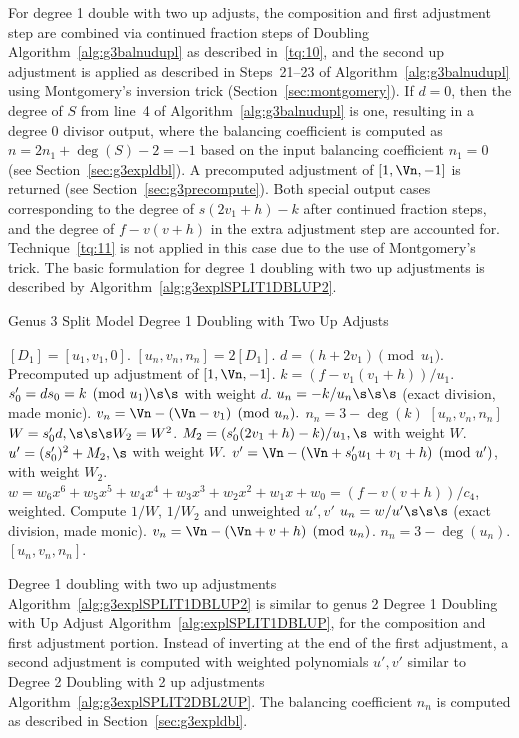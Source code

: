 For degree 1 double with two up adjusts, the composition and first adjustment
step are combined via continued
fraction steps of Doubling Algorithm~\ref{alg:g3balnudupl} as described
in~\ref{tq:10}, and the second up adjustment is applied as described in
Steps~21--23 of Algorithm~\ref{alg:g3balnudupl} using Montgomery's inversion
trick (Section~\ref{sec:montgomery}). If $d = 0$, then the degree of $S$ from
line~4 of Algorithm~\ref{alg:g3balnudupl} is one, resulting in a degree 0
divisor output, where the balancing coefficient is computed as $n = 2n_1 + \deg(S)
- 2 = -1$ based on the input balancing coefficient $n_1 = 0$ (see
Section~\ref{sec:g3expldbl}). A precomputed adjustment of $[1,\Vn,-1]$ is
returned (see Section~\ref{sec:g3precompute}). Both special output cases
corresponding to the degree of $s(2v_1 + h) - k$ after continued fraction steps,
and the degree of $f - v(v +h)$ in the extra adjustment step are accounted for.
Technique~\ref{tq:11} is not applied in this case due to the use of Montgomery's
trick. The basic formulation for degree 1 doubling with two up adjustments is
described by Algorithm~\ref{alg:g3explSPLIT1DBLUP2}.

\begin{algorithm}[htbp]
\caption{Genus 3 Split Model Degree 1 Doubling with Two Up Adjusts \label{alg:g3explSPLIT1DBLUP2}}
\begin{algorithmic} [1]
\Require $[D_1] = [u_1,v_1,0]$.  \smallskip
\Ensure $[u_n,v_n,n_n] = 2[D_1]$.
\algrule
\State
\State $d = (h + 2v_1) \pmod{u_1}$.
 \Return Precomputed up adjustment of $[1,\Vn,-1]$.
\EndIf
\State $k = (f - v_1(v_1 + h))/u_1$.
\State $s_0' = ds_0 = k \pmod{u_1} \s\s$ with weight $d$.
    \State $u_n = -k/u_n \s\s\s$ (exact division, made monic).
    \State $v_n = \Vn - (\Vn - v_1)  \pmod{u_n}.$
    \State $n_n = 3 - \deg(k)$
    \State \Return $[u_n,v_n,n_n]$
\EndIf
\State $W = s_0'd, \s\s\s W_2 = W^2$.
\State $M_2 = (s_0'(2v_1 + h)- k)/u_1, \s$ with weight $W$.
\State $u' = (s_0')^2 + M_2, \s $ with weight $W$.
\State $v' = \Vn - (\Vn + s_0'u_1 + v_1 + h) \pmod{u'}$, with weight $W_2$.
\State $w = w_6x^6 + w_5x^5 + w_4x^4 + w_3x^3 + w_2x^2 +w_1x + w_0 = (f - v(v + h))/c_4$, weighted.
\State Compute $1/W$, $1/W_2$ and unweighted $u',v'$
\State $u_n = w/u' \s\s\s$ (exact division, made monic).
\State $v_n = \Vn - (\Vn + v + h) \pmod{u_n}$.
\State $n_n = 3 - \deg(u_n)$.
\State \Return $[u_n,v_n,n_n]$.
\end{algorithmic}
\end{algorithm}
Degree 1 doubling with two up adjustments Algorithm~\ref{alg:g3explSPLIT1DBLUP2}
is similar to genus 2 Degree 1 Doubling with Up Adjust
Algorithm~\ref{alg:explSPLIT1DBLUP}, for the composition and first adjustment
portion. Instead of inverting at the end of the first adjustment, a second
adjustment is computed with weighted polynomials $u',v'$ similar to Degree 2
Doubling with 2 up adjustments Algorithm~\ref{alg:g3explSPLIT2DBL2UP}. The
balancing coefficient $n_n$ is computed as described in
Section~\ref{sec:g3expldbl}.


